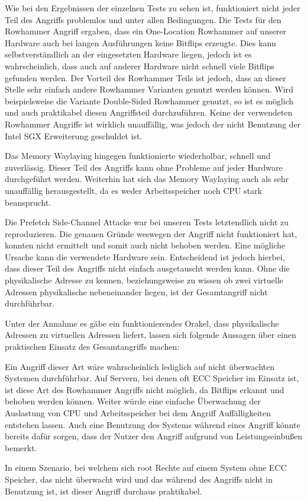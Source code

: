 Wie bei den Ergebnissen der einzelnen Tests zu sehen ist, funktioniert nicht jeder Teil des Angriffs problemlos und unter allen Bedingungen. Die Tests für den Rowhammer Angriff ergaben, dass ein One-Location Rowhammer auf unserer Hardware auch bei langen Ausführungen keine Bitflips erzeugte. Dies kann selbstverständlich an der eingesetzten Hardware liegen, jedoch ist es wahrscheinlich, dass auch auf anderer Hardware nicht schnell viele Bitflips gefunden werden. Der Vorteil des Rowhammer Teils ist jedoch, dass an dieser Stelle sehr einfach andere Rowhammer Varianten genutzt werden können. Wird beispielsweise die Variante Double-Sided Rowhammer genutzt, so ist es möglich und auch praktikabel diesen Angriffsteil durchzuführen. Keine der verwendeten Rowhammer Angriffe ist wirklich unauffällig, was jedoch der nicht Benutzung der Intel SGX Erweiterung geschuldet ist.

Das Memory Waylaying hingegen funktionierte wiederholbar, schnell und zuverlässig. Dieser Teil des Angriffs kann ohne Probleme auf jeder Hardware durchgeführt werden. Weiterhin hat sich das Memory Waylaying auch als sehr unauffällig herausgestellt, da es weder Arbeitsspeicher noch CPU stark beansprucht.

Die Prefetch Side-Channel Attacke war bei unseren Tests letztendlich nicht zu reproduzieren. Die genauen Gründe weswegen der Angriff nicht funktioniert hat, konnten nicht ermittelt und somit auch nicht behoben werden. Eine mögliche Ursache kann die verwendete Hardware sein. Entscheidend ist jedoch hierbei, dass dieser Teil des Angriffs nicht einfach ausgetauscht werden kann. Ohne die physikalische Adresse zu kennen, beziehungsweise zu wissen ob zwei virtuelle Adressen physikalische nebeneinander liegen, ist der Gesamtangriff nicht durchführbar.

Unter der Annahme es gäbe ein funktionierendes Orakel, dass physikalische Adressen zu virtuellen Adressen liefert, lassen sich folgende Aussagen über einen praktischen Einsatz des Gesamtangriffs machen:

Ein Angriff dieser Art wäre wahrscheinlich lediglich auf nicht überwachten Systemen durchführbar. Auf Servern, bei denen oft ECC Speicher im Einsatz ist, ist diese Art des Rowhammer Angriffs nicht möglich, da Bitflips erkannt und behoben werden können. Weiter würde eine einfache Überwachung der Auslastung von CPU und Arbeitsspeicher bei dem Angriff Auffälligkeiten entstehen lassen. Auch eine Benutzung des Systems während eines Angriff könnte bereits dafür sorgen, dass der Nutzer den Angriff aufgrund von Leistungseinbußen bemerkt.

In einem Szenario, bei welchem sich root Rechte auf einem System ohne ECC Speicher, das nicht überwacht wird und das während des Angriffs nicht in Benutzung ist, ist dieser Angriff durchaus praktikabel. 